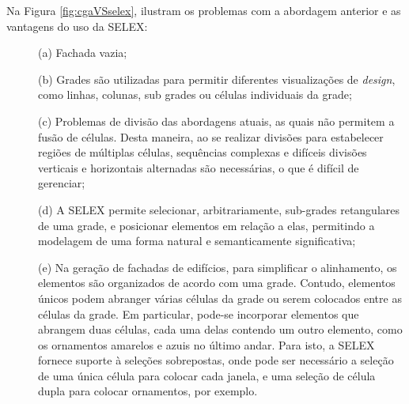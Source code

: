  Na Figura \ref{fig:cgaVSselex},  ilustram os problemas com a abordagem anterior e as vantagens do uso da \gls{SELEX}: 
 
 \begin{description}
     \item[] \; (a) Fachada vazia;
     
     \item[] \; (b) Grades são utilizadas para permitir diferentes visualizações de \textit{design}, como linhas, colunas, sub grades ou células individuais da grade;
     
     \item[] \; (c) Problemas de divisão das abordagens atuais, as quais não permitem a fusão de células. Desta maneira, ao se realizar divisões para estabelecer regiões de múltiplas células, sequências complexas e difíceis divisões verticais e horizontais alternadas são necessárias, o que é difícil de gerenciar;
     
     \item[] \; (d) A \gls{SELEX} permite selecionar, arbitrariamente, sub-grades retangulares de uma grade, e posicionar elementos em relação a elas, permitindo a modelagem de uma forma natural e semanticamente significativa;
     
     \item[] \; (e) Na geração de fachadas de edifícios, para simplificar o alinhamento, os elementos são organizados de acordo com uma grade. Contudo, elementos únicos podem abranger várias células da grade ou serem colocados entre as células da grade. Em particular, pode-se incorporar elementos que abrangem duas células, cada uma delas contendo um outro elemento, como os ornamentos amarelos e azuis no último andar. Para isto, a \gls{SELEX} fornece suporte à seleções sobrepostas, onde pode ser necessário a seleção de uma única célula para colocar cada janela, e uma seleção de célula dupla para colocar ornamentos, por exemplo.
 \end{description}
 

\begin{figure}[h!]
	\centering
	\captionsetup{width=15cm}
	{}	
\end{figure}

